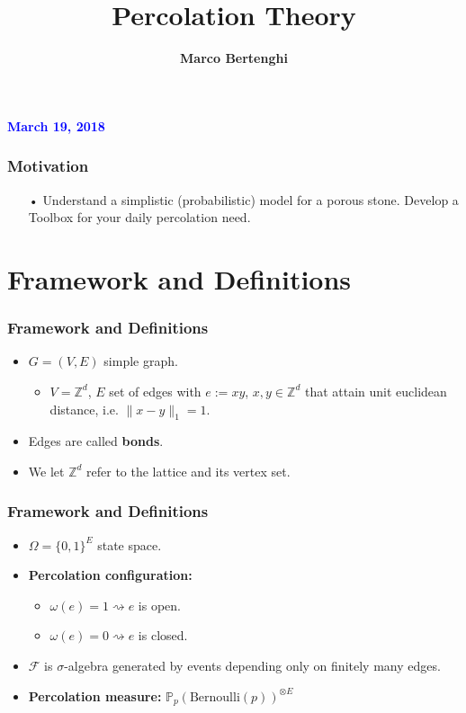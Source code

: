 \documentclass[compress,mathserif,serif]{beamer}
\title[Percolation]{Percolation Theory}
\author[Marco Bertenghi]{\bf Marco Bertenghi}
\institute[UZH]{\bf University of Zurich}
\date{}
\begin{document}
\begin{frame}
\titlepage
\centerline{\textcolor{blue}{\bf March 19, 2018}}
\vspace{0.5cm}
\end{frame}


\begin{frame}
\frametitle{Motivation}
\begin{itemize}
\item[•] \Large{Understand a simplistic (probabilistic) model for a porous stone. Develop a Toolbox for your daily percolation need.}
\end{itemize}
\end{frame}

\begin{frame}
\tableofcontents
\end{frame}

\section{Framework and Definitions}


\begin{frame}
\begin{center}
\Huge{}
\end{center}
\end{frame}

\begin{frame}
\frametitle{Framework and Definitions}
\begin{itemize}
\item $G=(V,E)$ simple graph.
\pause
\begin{itemize}
\item $V= \mathbb{Z}^d$, $E$ set of edges with $e:=xy$, $x,y \in \mathbb{Z}^d$ that attain unit euclidean distance, i.e. $\| x-y\|_1=1$.
\end{itemize}
\pause
\item Edges are called \textbf{bonds}.
\pause 
\item We let $\mathbb{Z}^d$ refer to the lattice and its vertex set.
\end{itemize}
\end{frame}

\begin{frame}
\frametitle{Framework and Definitions}
\begin{itemize}
\item $\Omega = \{0,1\}^E$ state space.
\pause
\item \textbf{Percolation configuration:}
\begin{itemize}
\item $\omega(e)=1 \rightsquigarrow e$ is open.
\item $ \omega(e)=0 \rightsquigarrow e$ is closed.
\end{itemize}
\pause
\item $\mathcal{F}$ is $\sigma$-algebra generated by events depending only on finitely many edges. 
\pause
\item \textbf{Percolation measure:} $\mathbb{P}_p(\text{Bernoulli}(p))^{\otimes E}$
\end{itemize}
\end{frame}
\end{document}

